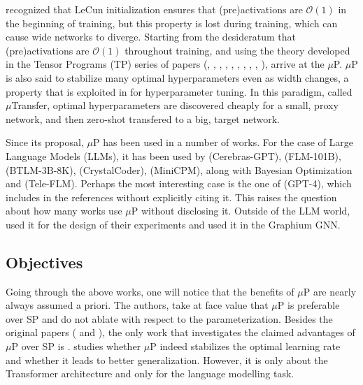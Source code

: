 \documentclass{article}
\begin{document}
\cite{yang2020feature} recognized that LeCun initialization ensures that (pre)activations are $\mathcal{O}(1)$ in the beginning of training, but this property is lost during training, which can cause wide networks to diverge. Starting from the desideratum that (pre)activations are $\mathcal{O}(1)$ throughout training, and using the theory developed in the Tensor Programs (TP) series of papers (\cite{yang2019scaling}, \cite{yang2019wide}, \cite{yang2020tensor}, \cite{yang2021tensor}, \cite{yang2020tensor2}, \cite{yang2020feature}, \cite{littwin2022adaptive}, \cite{yang2023spectral}, \cite{yang2021tuning}, \cite{yang2023feature}), \cite{yang2020feature} arrive at the $\mu$P. $\mu$P is also said to stabilize many optimal hyperparameters even as width changes, a property that is exploited in \cite{yang2021tuning} for hyperparameter tuning. In this paradigm, called $\mu$Transfer, optimal hyperparameters are discovered cheaply for a small, proxy network, and then zero-shot transfered to a big, target network.

Since its proposal, $\mu$P has been used in a number of works. For the case of Large Language Models (LLMs), it has been used by \cite{dey2023cerebras} (Cerebras-GPT), \cite{li2023flm} (FLM-101B), \cite{dey2023btlm} (BTLM-3B-8K), \cite{liu2023llm360} (CrystalCoder), \cite{hu2024minicpm} (MiniCPM), along with Bayesian Optimization and \cite{li2024tele} (Tele-FLM). Perhaps the most interesting case is the one of \cite{achiam2023gpt} (GPT-4), which includes \cite{yang2021tensor} in the references without explicitly citing it. This raises the question about how many works use $\mu$P without disclosing it. Outside of the LLM world, \cite{cabannes2023associative} used it for the design of their experiments and \cite{beaini2023towards} used it in the Graphium GNN.

\subsection{Objectives}
Going through the above works, one will notice that the benefits of $\mu$P are nearly always assumed a priori. The authors, take at face value that $\mu$P is preferable over SP and do not ablate with respect to the parameterization. Besides the original papers (\cite{yang2020feature} and \cite{yang2021tuning}), the only work that investigates the claimed advantages of $\mu$P over SP is \cite{lingle2024large}. \cite{lingle2024large} studies whether $\mu$P indeed stabilizes the optimal learning rate and whether it leads to better generalization. However, it is only about the Transformer architecture and only for the language modelling task.
\end{document}
